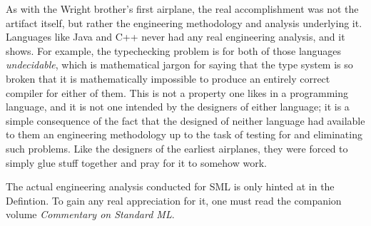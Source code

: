As with the Wright brother's first airplane, the real accomplishment 
was not the artifact itself, but rather the engineering methodology 
and analysis underlying it.  Languages like Java and C++ never had any 
real engineering analysis, and it shows.  For example, the 
typechecking problem is for both of those languages {\it undecidable}, 
which is mathematical jargon for saying that the type system is so 
broken that it is mathematically impossible to produce an entirely 
correct compiler for either of them.  This is not a property one likes 
in a programming language, and it is not one intended by the designers 
of either language; it is a simple consequence of the fact that the 
designed of neither language had available to them an engineering 
methodology up to the task of testing for and eliminating such 
problems.  Like the designers of the earliest airplanes, they were 
forced to simply glue stuff together and pray for it to somehow work. 

The actual engineering analysis conducted for SML is only hinted at  
in the Defintion.  To gain any real appreciation for it, one must read  
the companion volume {\it Commentary on Standard ML}. 

